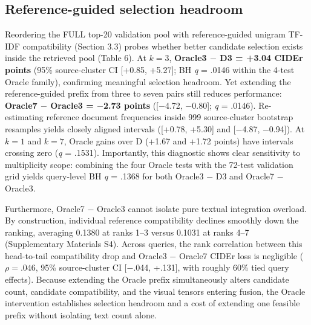 \documentclass[11pt,a4paper]{article}
\begin{document}
\subsection{Reference-guided selection headroom}
Reordering the FULL top-20 validation pool with reference-guided unigram TF-IDF compatibility (Section 3.3) probes whether better candidate selection exists inside the retrieved pool (Table 6). At $k=3$, \textbf{Oracle3 $-$ D3 = +3.04 CIDEr points} (95\% source-cluster CI [+0.85, +5.27]; BH \emph{q} = .0146 within the 4-test Oracle family), confirming meaningful selection headroom. Yet extending the reference-guided prefix from three to seven pairs still reduces performance: \textbf{Oracle7 $-$ Oracle3 = $-$2.73 points} ([$-$4.72, $-$0.80]; \emph{q} = .0146). Re-estimating reference document frequencies inside 999 source-cluster bootstrap resamples yields closely aligned intervals ([+0.78, +5.30] and [$-$4.87, $-$0.94]). At $k=1$ and $k=7$, Oracle gains over D (+1.67 and +1.72 points) have intervals crossing zero (\emph{q} = .1531). Importantly, this diagnostic shows clear sensitivity to multiplicity scope: combining the four Oracle tests with the 72-test validation grid yields query-level BH \emph{q} = .1368 for both Oracle3 $-$ D3 and Oracle7 $-$ Oracle3.

\begin{table}[t]
\centering
\small
\caption{Reference-guided Oracle contrasts on repaired MSR-VTT validation (\emph{n} = 497; 361 sources) with pointwise 95\% source-cluster CIs and BH adjustment within the four-contrast Oracle family.}
\label{tab:6}
\end{table}

Furthermore, Oracle7 $-$ Oracle3 cannot isolate pure textual integration overload. By construction, individual reference compatibility declines smoothly down the ranking, averaging 0.1380 at ranks 1--3 versus 0.1031 at ranks 4--7 (Supplementary Materials S4). Across queries, the rank correlation between this head-to-tail compatibility drop and Oracle3 $-$ Oracle7 CIDEr loss is negligible ($\rho = .046$, 95\% source-cluster CI [$-$.044, +.131], with roughly 60\% tied query effects). Because extending the Oracle prefix simultaneously alters candidate count, candidate compatibility, and the visual tensors entering fusion, the Oracle intervention establishes selection headroom and a cost of extending one feasible prefix without isolating text count alone.
\end{document}
